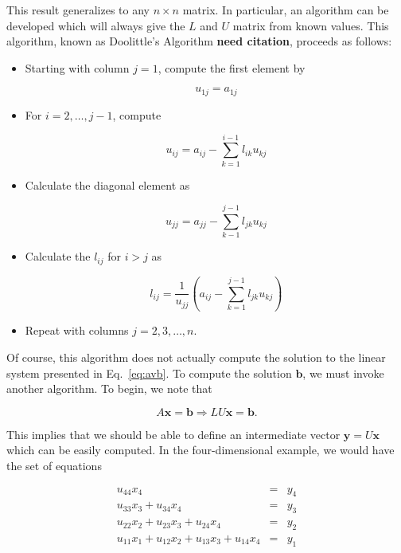 \documentclass[12pt]{article}
\numberwithin{equation}{section}
\begin{document}
\noindent This result generalizes to any $n\times n$ matrix.  In particular, an algorithm can be developed which will always give the $L$ and $U$ matrix from known values.  This algorithm, known as Doolittle's Algorithm \textbf{need citation}, proceeds as follows:

\begin{itemize}
\item Starting with column $j=1$, compute the first element by 

\begin{equation}
u_{1j}=a_{1j}
\end{equation}

\item For $i=2,\ldots,j-1$, compute

\begin{equation}
u_{ij}=a_{ij}-\sum_{k=1}^{i-1}l_{ik}u_{kj}
\end{equation}

\item Calculate the diagonal element as

\begin{equation}
u_{jj}=a_{jj}-\sum_{k-1}^{j-1} l_{jk}u_{kj}
\end{equation}

\item Calculate the $l_{ij}$ for $i>j$ as

\begin{equation}
l_{ij}=\frac{1}{u_{jj}}\left(a_{ij}-\sum_{k=1}^{j-1} l_{jk}u_{kj}\right)
\end{equation}

\item Repeat with columns $j=2,3,\ldots,n$.
\end{itemize}

\noindent Of course, this algorithm does not actually compute the solution to the linear system presented in Eq.~\ref{eq:avb}.  To compute the solution $\textbf{b}$, we must invoke another algorithm.  To begin, we note that

\begin{equation}
\label{eq:axbluxb}
A\textbf{x}=\textbf{b}\Rightarrow LU\textbf{x}=\textbf{b}.
\end{equation}

\noindent This implies that we should be able to define an intermediate vector $\textbf{y}=U\textbf{x}$ which can be easily computed.  In the four-dimensional example, we would have the set of equations

$$\begin{array}{rcc} u_{44}x_{4}&=&y_{4} \\
u_{33}x_{3}+u_{34}x_{4}&=&y_{3} \\
u_{22}x_{2}+u_{23}x_{3}+u_{24}x_{4}&=&y_{2} \\
u_{11}x_{1}+u_{12}x_{2}+u_{13}x_{3}+u_{14}x_{4}&=& y_{1} \end{array}$$
\end{document}
